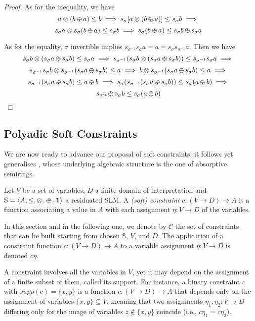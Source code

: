 \documentclass{llncs}
\def\monid{{\mathbf 0}}
\def\monop{\otimes}
\def\odiv{\, {\ominus\hspace{-7.7pt} \div} \,}
\def\monid{\mathbf{1}}
\begin{document}
\begin{proof}
As for the inequality, we have
\[ a \otimes (b \odiv a) \leq b \implies s_\sigma [a \otimes (b \odiv a)] \leq s_\sigma b \implies \]
\[ s_\sigma a \otimes s_\sigma(b \odiv a) \leq s_\sigma b \implies s_\sigma (b \odiv a) \leq s_\sigma b \odiv s_\sigma a \]

As for the equality, $\sigma$ invertible implies $s_{\sigma^{-1}} s_{\sigma} a = a 
= s_{\sigma} s_{\sigma^{-1}} a$. Then we have
\[ s_\sigma b \otimes (s_\sigma a \odiv s_\sigma b) \leq s_\sigma a  \implies
   s_{\sigma^{-1}} (s_\sigma b \otimes (s_\sigma a \odiv s_\sigma b))
\leq s_{\sigma^{-1}} s_\sigma a  \implies \]
\[ s_{\sigma^{-1}} s_\sigma b \otimes s_{\sigma^{-1}} (s_\sigma a \odiv s_\sigma b) \leq a \implies
   b \otimes s_{\sigma^{-1}} (s_\sigma a \odiv s_\sigma b) \leq a \implies \]
\[ s_{\sigma^{-1}} (s_\sigma a \odiv s_\sigma b) \leq a \odiv b \implies
   s_\sigma (s_{\sigma^{-1}} (s_\sigma a \odiv s_\sigma b)) \leq s_\sigma (a \odiv b) \implies \]
\[ s_\sigma a \odiv s_\sigma b \leq s_\sigma (a \odiv b) \]
\end{proof}

\subsection{Polyadic Soft Constraints}\label{sec:softconstraints}
\label{subsec:inst} 
We are now ready to advance our proposal of soft constraints: it follows yet generalises \cite{scc},
whose underlying algebraic structure is the one of absorptive semirings.

\begin{definition}\label{def:softconstraints}
	Let $V$ be a set of variables, $D$ a finite domain of interpretation
	and ${\mathbb S} = \langle A, \leq, \monop, \odiv, \monid \rangle$ a residuated SLM.
	A \emph{(soft) constraint} $c: (V \rightarrow D) \rightarrow
	A$ is a function associating a value in $A$ with each assignment
	$\eta: V\rightarrow D$ of the variables.
\end{definition}

In this section and in the following one, we denote by $\mathcal{C}$ the set of constraints that can be
built starting from chosen $\mathbb S$, $V$, and $D$. The application of a
constraint function $c:(V \rightarrow D) \rightarrow A$ to a variable
assignment $\eta:V\rightarrow D$ is denoted $c\eta$.  

A constraint involves all the variables in $V$, yet it may depend on
the assignment of a finite subset of them, called its support. For
instance, a binary constraint $c$ with $supp(c)=\{x,y\}$ is a function
$c: (V\rightarrow D)\rightarrow A$ that depends only on the
assignment of variables $\{x,y\}\subseteq V$, meaning that two
assignments $\eta_1, \eta_2: V \rightarrow D$ differing only for the
image of variables $z \not \in \{x,y\}$ coincide (i.e., $c\eta_1 =
c\eta_2$).
%
\end{document}
